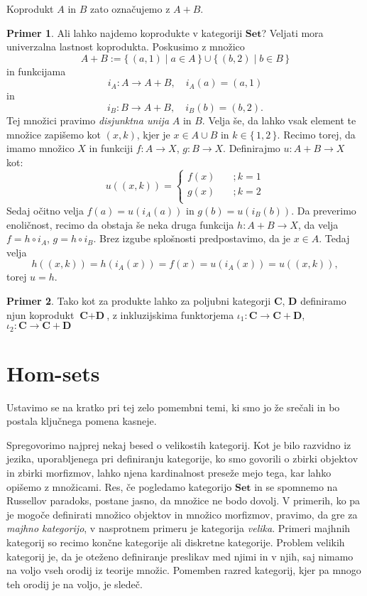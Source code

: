 \documentclass[12pt,a4paper]{book}
\theoremstyle{definition}
\theoremstyle{plain}
\theoremstyle{definition}
\newtheorem{primer}{Primer}[section]
\theoremstyle{remark}
\newcommand{\cat}[1]{\textbf{#1}}
\renewcommand{\set}[1]{\{\,#1\,\}}
\begin{document}
Koprodukt $A$ in $B$ zato označujemo z $A + B$.
\begin{primer}
Ali lahko najdemo koprodukte v kategoriji $\cat{Set}$? 
Veljati mora univerzalna lastnost koprodukta.
Poskusimo z množico 
$$A+B := \set{(a,1) \mid a \in A} \cup \set{(b,2) \mid b \in B}$$
in funkcijama 
$$i_A : A \to A + B, \quad i_A(a) = (a,1)$$ 
in 
$$i_B : B \to A+B, \quad i_B(b) = (b,2).$$
Tej množici pravimo \emph{disjunktna unija} $A$ in $B$. Velja še, da lahko vsak element te množice zapišemo kot $(x,k)$, kjer je $x \in A \cup B$ in $k \in \set{1,2}$. Recimo torej, da imamo množico $X$ in funkciji $f : A \to X$, $g: B \to X$. Definirajmo $u: A+B \to X$ kot:
\[
u((x,k)) = 
	\begin{cases}
		f(x) &\quad ;k = 1 \\
		g(x) &\quad ;k = 2 \\
	\end{cases}
\]
Sedaj očitno velja $f(a) = u(i_A(a))$ in $g(b) = u(i_B(b))$. Da preverimo enoličnost, recimo da obstaja še neka druga funkcija $h : A+B \to X$, da velja $f = h \circ i_A$, $g = h \circ i_B$. Brez izgube splošnosti predpostavimo, da je $x \in A$. Tedaj velja
$$h((x,k)) = h(i_A(x)) = f(x) = u(i_A(x)) = u((x,k)),$$
torej $u = h$.
\end{primer}

\begin{primer}
Tako kot za produkte lahko za poljubni kategorji $\cat{C}$, $\cat{D}$ definiramo njun koprodukt $\cat{C} + \cat{D}$, z inkluzijskima funktorjema $\iota_1 : \cat{C} \to \cat{C} + \cat{D}$, $\iota_2 : \cat{C} \to \cat{C} + \cat{D}$
\end{primer}

\section{Hom-sets}
Ustavimo se na kratko pri tej zelo pomembni temi, ki smo jo že srečali in bo postala ključnega pomena kasneje.


Spregovorimo najprej nekaj besed o velikostih kategorij. Kot je bilo razvidno iz jezika, uporabljenega pri definiranju kategorije, ko smo govorili o zbirki objektov in zbirki morfizmov, lahko njena kardinalnost preseže mejo tega, kar lahko opišemo z množicami. Res, če pogledamo kategorijo $\cat{Set}$ in se spomnemo na Russellov paradoks, postane jasno, da množice ne bodo dovolj. V primerih, ko pa je mogoče definirati množico objektov in množico morfizmov, pravimo, da gre za \emph{majhno kategorijo}, v nasprotnem primeru je kategorija \emph{velika}. Primeri majhnih kategorij so recimo končne kategorije ali diskretne kategorije. Problem velikih kategorij je, da je oteženo definiranje preslikav med njimi in v njih, saj nimamo na voljo vseh orodij iz teorije množic. Pomemben razred kategorij, kjer pa mnogo teh orodij je na voljo, je sledeč.
\end{document}
